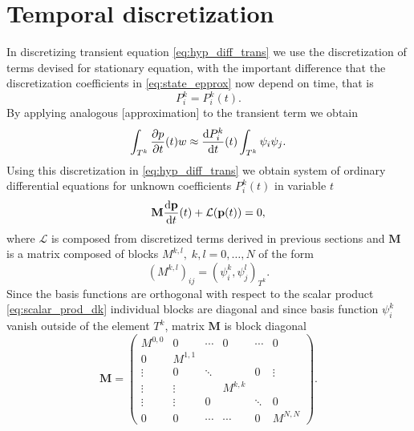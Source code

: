 \newpage
\section{Temporal discretization}
\label{se:time_theory}
%
In discretizing transient equation \eqref{eq:hyp_diff_trans} we use the 
discretization of terms devised for stationary equation, with the important 
difference that the discretization coefficients in \eqref{eq:state_epprox} now 
depend on time, that is
\begin{equation}
    P^k_i = P^k_i(t).
\end{equation}
By applying analogous [\todo approximation] to the transient term we obtain
\begin{equation}
    \int_{T^k}\frac{\partial p}{\partial t}(t)w \approx  \frac{\text{d}P^k_i}{\text{d}t}(t)\int_{T^k}\psi_i\psi_j. 
\end{equation}
Using this discretization in \eqref{eq:hyp_diff_trans} we obtain system of 
ordinary differential equations for unknown coefficients 
$P^k_i(t)$ in variable $t$
\begin{equation}\label{eq:time_diff}
    \mathbf{M}  \frac{\text{d}\mathbf{p}}{\text{d}t}(t) + \mathcal{L}(\mathbf{p}(t)) = 0,
\end{equation}
where $\mathcal{L}$  is composed from discretized terms  derived in previous 
sections and $\mathbf{M}$ is a matrix composed of blocks $M^{k,l},\; k,l=0, 
\ldots , N$ of the 
form
\begin{equation}
(M^{k,l})_{ij} = ( \psi^k_i,\psi^l_j)_{T^k}.
\end{equation}
Since the basis functions are orthogonal with respect to the scalar product 
\eqref{eq:scalar_prod_dk} individual blocks are diagonal and since basis 
function $\psi^k_i$ vanish outside of the element $T^k$, matrix $\mathbf{M}$ 
is block diagonal 
\begin{equation}
\mathbf{M}  = \begin{pmatrix}
        M^{0,0}      &    0   &\cdots&  0   &\cdots&0\\
        0         &   M^{1,1}  &      &      &      &\\
        \vdots     &    0   &\ddots&      &  0   &\vdots\\
      \vdots     & \vdots &      & M^{k,k}  &      &\\
        \vdots   & \vdots & 0    &      &\ddots&0\\
        0         &   0    &\cdots&\cdots&   0  &M^{N,N} 
    \end{pmatrix}.
\end{equation}
